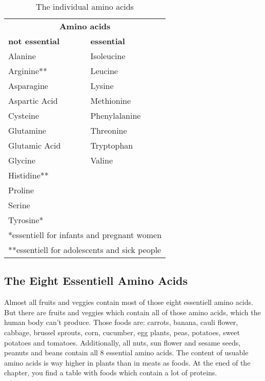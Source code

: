 \documentclass[../main.tex]{subfiles}
\begin{document}
  \begin{table}[htb!]
    \centering
    \begin{tabular}{l|l}
      \multicolumn{2}{c}{\textbf{Amino acids}} \\
      \textbf{not essential} & \textbf{essential} \\
      \hline
      Alanine & Isoleucine \\
      Arginine** & Leucine \\
      Asparagine & Lysine \\
      Aspartic Acid & Methionine \\
      Cysteine & Phenylalanine \\
      Glutamine & Threonine \\
      Glutamic Acid & Tryptophan \\
      Glycine & Valine \\
      Histidine**\\
      Proline\\
      Serine\\
      Tyrosine*\\
      \hline
      \multicolumn{2}{l}{\footnotesize{*essentiell for infants and pregnant women}}\\
      \multicolumn{2}{l}{\footnotesize{**essentiell for adolescents and sick people}}
    \end{tabular}
    \caption{The individual amino acids}
  \end{table}

  \subsection{The Eight Essentiell Amino Acids}

  Almost all fruits and veggies contain most of those eight essentiell amino acids.
  But there are fruits and veggies which contain all of those amino acids, which the human body can't produce.
  Those foods are: carrots, banana, cauli flower, cabbage, brussel sprouts, corn, cucumber, egg plants, peas, potatoes, sweet potatoes and tomatoes.
  Additionally, all nuts, sun flower and sesame seeds, peanuts and beans contain all 8 essential amino acids.
  The content of usuable amino acids is way higher in plants than in meats as foods.
  At the ened of the chapter, you find a table with foods which contain a lot of proteins.
\end{document}
